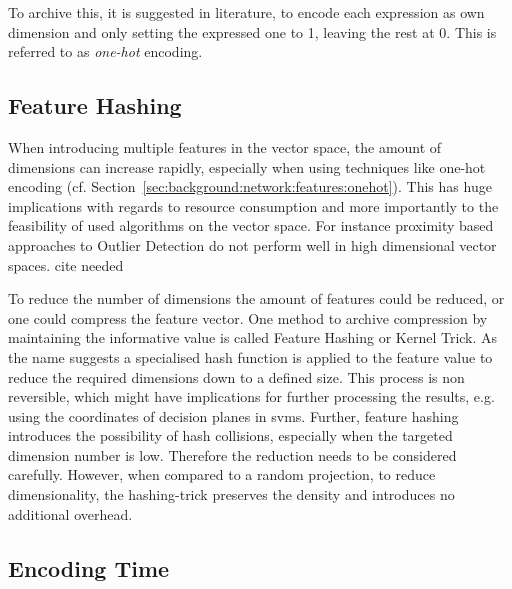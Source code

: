 To archive this, it is suggested in literature, to encode each expression as own dimension and only setting the expressed one to 1, leaving the rest at 0. This is referred to as \emph{one-hot} encoding. \parencite[cf.][]{Coates2011}

\subsection{Feature Hashing}
\label{sec:background:network:features:hashing}

When introducing multiple features in the vector space, the  amount of dimensions can increase rapidly, especially when using techniques like one-hot encoding (cf. Section~\ref{sec:background:network:features:onehot}).
This has huge implications with regards to resource consumption and more importantly to the feasibility of used algorithms on the vector space.
For instance proximity based approaches to Outlier Detection do not perform well in high dimensional vector spaces. \alert{cite needed}

To reduce the number of dimensions the amount of features could be reduced, or one could compress the feature vector. One method to archive compression by maintaining the informative value is called Feature Hashing or Kernel Trick. \parencite{Weinberger2009,Shi2009}
As the name suggests a specialised hash function is applied to the feature value to reduce the required dimensions down to a defined size.
This process is non reversible, which might have implications for further processing the results, e.g. using the coordinates of decision planes in \glspl{svm}.
Further, feature hashing introduces the possibility of hash collisions, especially when the targeted dimension number is low. Therefore the reduction needs to be considered carefully.
However, when compared to a random projection, to reduce dimensionality, the hashing-trick preserves the density and introduces no additional overhead. \parencite{Weinberger2009,Shi2009}

\subsection{Encoding Time}
\label{sec:background:network:features:time}



